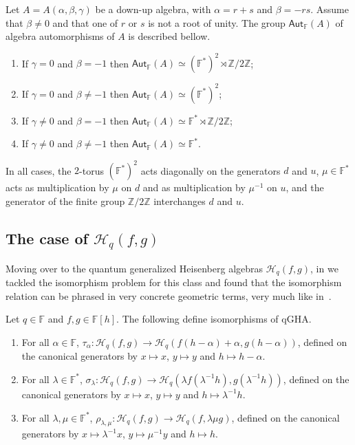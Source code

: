 \documentclass{commat}
\newcommand{\FF}{\mathbb{F}}
\newcommand{\ZZ}{\mathbb{Z}}
\newcommand{\hqfg}[1][f,g]{\mathcal{H}_q(#1)}
\newcommand\aut[1][\FF]{ \mathsf{Aut}_{#1}}
\begin{document}
\begin{theorem}\label{T:adua:dua:main2}
	Let $A=A(\alpha, \beta, \gamma)$ be a down-up algebra, with $\alpha=r+s$ and $\beta=-rs$. Assume that $\beta\neq 0$ and 
	that one of $r$ or $s$ is not a root of unity. The group $\aut (A)$ of algebra automorphisms of $A$ is described bellow.
	\begin{enumerate}
		\item If $\gamma=0$ and $\beta=-1$ then $\aut (A)\simeq\left(\FF^{*} \right)^{2}\rtimes\ZZ/2\ZZ$;
		\item If $\gamma=0$ and $\beta\neq-1$ then $\aut (A)\simeq\left(\FF^{*} \right)^{2}$;
		\item If $\gamma\neq0$ and $\beta=-1$ then $\aut (A)\simeq\FF^{*}\rtimes\ZZ/2\ZZ$;
		\item If $\gamma\neq0$ and $\beta\neq-1$ then $\aut (A)\simeq\FF^{*}$.
	\end{enumerate}
	In all cases, the $2$-torus $\left(\FF^{*} \right)^{2}$ acts diagonally on the generators $d$ and $u$, $\mu\in\FF^{*}$ acts as multiplication by $\mu$ on $d$ and as multiplication by $\mu^{-1}$ on $u$, and the generator of the finite group $\ZZ/2\ZZ$ interchanges $d$ and $u$.
\end{theorem}

\subsection{The case of \texorpdfstring{$\hqfg$}{Hq(f,g)}}\label{SS:isoautder:hqfg}

Moving over to the quantum generalized Heisenberg algebras $\hqfg$, in \cite{LR22jaa} we tackled the isomorphism problem for this class and found that the isomorphism relation can be phrased in very concrete geometric terms, very much like in~\cite{BJ01}. 

\begin{proposition}\label{Prop7} 
	Let $q\in\FF$ and $f,g \in\FF[h]$. The following define isomorphisms of qGHA.
	\begin{enumerate}[label=\Roman*.,ref=\Roman*]
		\item For all $\alpha\in\FF$, $\tau_{\alpha}:\hqfg\longrightarrow \hqfg[f(h-\alpha)+\alpha, g(h-\alpha)]$, defined on the canonical generators by $x\mapsto  x$, $y\mapsto  y$ and $h\mapsto  h-\alpha$.\label{P:7:I}
		
		\item For all $\lambda\in\FF^*$, $\sigma_{\lambda}:\hqfg\longrightarrow \hqfg[\lambda f(\lambda^{-1}h), g(\lambda^{-1}h)]$, defined on the canonical generators by $x\mapsto  x$, $y\mapsto  y$ and $h\mapsto  \lambda^{-1}h$.\label{P:7:II}
		
		\item For all $\lambda, \mu\in\FF^*$, $\rho_{\lambda,\mu}:\hqfg\longrightarrow \hqfg[f,\lambda\mu g]$, defined on the canonical generators by $x\mapsto  \lambda^{-1}x$, $y\mapsto  \mu^{-1}y$ and $h\mapsto h$.\label{P:7:III}
	\end{enumerate}
\end{proposition}
\end{document}
